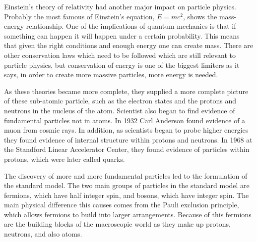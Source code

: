 Einstein's theory of relativity had another major impact on particle physics. Probably the most famous of Einstein's equation, $E = mc^2$, shows the mass-energy relationship. One of the implications of quantum mechanics is that if something can happen it will happen under a certain probability. This means that given the right conditions and enough energy one can create mass. There are other conservation laws which need to be followed which are still relevant to particle physics, but conservation of energy is one of the biggest limiters as it says, in order to create more massive particles, more energy is needed. 

As these theories became more complete, they supplied a more complete picture of these sub-atomic particle, such as the electron states and the protons and neutrons in the nucleus of the atom. Scientist also began to find evidence of fundamental particles not in atoms. In 1932 Carl Anderson found evidence of a muon from cosmic rays. In addition, as scientists began to probe higher energies they found evidence of internal structure within protons and neutrons. In 1968 at the Standford Linear Accelerator Center, they found evidence of particles within protons, which were later called quarks.

The discovery of more and more fundamental particles led to the formulation of the standard model. The two main groups of particles in the standard model are fermions, which have half integer spin, and bosons, which have integer spin. The main physical difference this causes comes from the Pauli exclusion principle, which allows fermions to build into larger arrangements. Because of this fermions are the building blocks of the macroscopic world as they make up protons, neutrons, and also atoms.   

